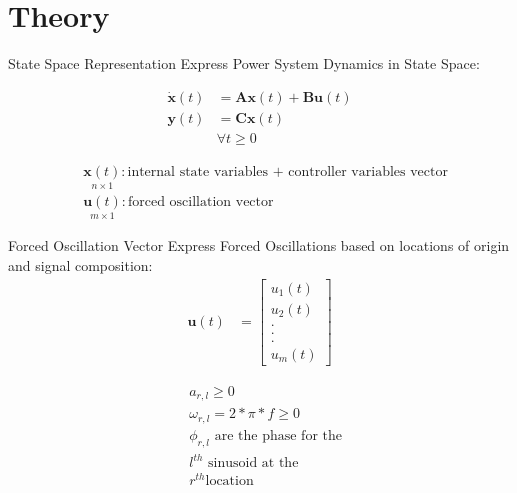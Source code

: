 \section[Theory]{Theory}
\label{sec:lasso_theory}

\begin{frame}[fragile]{State Space Representation}
	Express Power System Dynamics in State Space:

	\begin{align*}
		\dot{\textbf{x}}(t) &= 
		\textbf{A}\textbf{x}(t)
		+ \textbf{B}\textbf{u}(t)\\
		\textbf{y}(t) &= 
		\textbf{C}\textbf{x}(t)\\  
		& \forall t\geq0	
	\end{align*}
	
	\begin{align*}
		& \underset{\scriptscriptstyle n\times 1}{\textbf{x}(t)} : \text{internal state variables + controller variables vector}                                                                      \\
		& \underset{\scriptscriptstyle m\times 1}{\textbf{u}(t)} : \text{forced oscillation vector}
	\end{align*}
\end{frame}

\begin{frame}[fragile]{Forced Oscillation Vector}
	Express Forced Oscillations based on locations of origin and signal composition:
		\begin{align*}
			\textbf{u}(t) &= 
			\begin{bmatrix}
				u_1(t) \\
				u_2(t) \\
				. \\
				. \\
				. \\
				u_m(t)
			\end{bmatrix}		
		\end{align*}
	
	\begin{align}
		& a_{r,l} \geq0 \\
		& \omega_{r,l} = 2*\pi*f \geq 0 \\
		& \phi_{r,l} \text{ are the phase for the} \\
		& l^{th} \text{ sinusoid at the} \\
		& r^{th} \text{location}
	\end{align}
\end{frame}